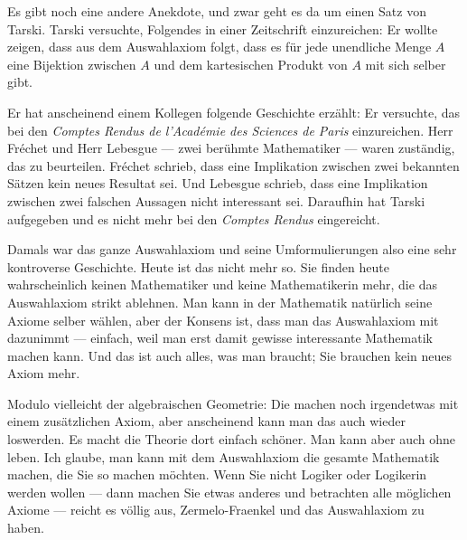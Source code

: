 \begin{spoken-clean}[01:08:40 - 01:10:40]
Es gibt noch eine andere Anekdote, und zwar geht es da um einen Satz von Tarski. Tarski versuchte, Folgendes in einer Zeitschrift einzureichen: Er wollte zeigen, dass aus dem Auswahlaxiom folgt, dass es für jede unendliche Menge $A$ eine Bijektion zwischen $A$ und dem kartesischen Produkt von $A$ mit sich selber gibt.

Er hat anscheinend einem Kollegen folgende Geschichte erzählt: Er versuchte, das bei den \emph{Comptes Rendus de l'Académie des Sciences de Paris} einzureichen. Herr Fréchet und Herr Lebesgue --- zwei berühmte Mathematiker --- waren zuständig, das zu beurteilen. Fréchet schrieb, dass eine Implikation zwischen zwei bekannten Sätzen kein neues Resultat sei. Und Lebesgue schrieb, dass eine Implikation zwischen zwei falschen Aussagen nicht interessant sei. Daraufhin hat Tarski aufgegeben und es nicht mehr bei den \emph{Comptes Rendus} eingereicht.
\end{spoken-clean}

\begin{math-stroke}
\end{math-stroke}

\begin{spoken-clean}[01:10:40 - 01:12:40]
Damals war das ganze Auswahlaxiom und seine Umformulierungen also eine sehr kontroverse Geschichte. Heute ist das nicht mehr so. Sie finden heute wahrscheinlich keinen Mathematiker und keine Mathematikerin mehr, die das Auswahlaxiom strikt ablehnen. Man kann in der Mathematik natürlich seine Axiome selber wählen, aber der Konsens ist, dass man das Auswahlaxiom mit dazunimmt --- einfach, weil man erst damit gewisse interessante Mathematik machen kann. Und das ist auch alles, was man braucht; Sie brauchen kein neues Axiom mehr.

Modulo vielleicht der algebraischen Geometrie: Die machen noch irgendetwas mit einem zusätzlichen Axiom, aber anscheinend kann man das auch wieder loswerden. Es macht die Theorie dort einfach schöner. Man kann aber auch ohne leben. Ich glaube, man kann mit dem Auswahlaxiom die gesamte Mathematik machen, die Sie so machen möchten. Wenn Sie nicht Logiker oder Logikerin werden wollen --- dann machen Sie etwas anderes und betrachten alle möglichen Axiome --- reicht es völlig aus, Zermelo-Fraenkel und das Auswahlaxiom zu haben.
\end{spoken-clean}

